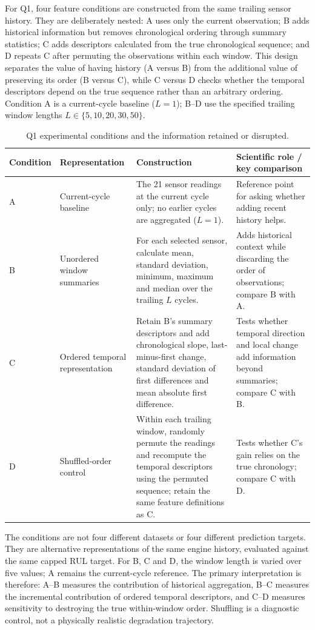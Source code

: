 \documentclass[10pt,a4paper]{article}
\begin{document}
For Q1, four feature conditions are constructed from the same trailing sensor history. They are deliberately nested: A uses only the current observation; B adds historical information but removes chronological ordering through summary statistics; C adds descriptors calculated from the true chronological sequence; and D repeats C after permuting the observations within each window. This design separates the value of having history (A versus B) from the additional value of preserving its order (B versus C), while C versus D checks whether the temporal descriptors depend on the true sequence rather than an arbitrary ordering. Condition A is a current-cycle baseline ($L=1$); B--D use the specified trailing window lengths $L\in\{5,10,20,30,50\}$.

\begin{table}[H]\centering\small
\caption{Q1 experimental conditions and the information retained or disrupted.}
\begin{tabularx}{\linewidth}{@{}l l Y Y@{}}\toprule
Condition & Representation & Construction & Scientific role / key comparison\\\midrule
A & Current-cycle baseline & The 21 sensor readings at the current cycle only; no earlier cycles are aggregated ($L=1$). & Reference point for asking whether adding recent history helps.\\
B & Unordered window summaries & For each selected sensor, calculate mean, standard deviation, minimum, maximum and median over the trailing $L$ cycles. & Adds historical context while discarding the order of observations; compare B with A.\\
C & Ordered temporal representation & Retain B's summary descriptors and add chronological slope, last-minus-first change, standard deviation of first differences and mean absolute first difference. & Tests whether temporal direction and local change add information beyond summaries; compare C with B.\\
D & Shuffled-order control & Within each trailing window, randomly permute the readings and recompute the temporal descriptors using the permuted sequence; retain the same feature definitions as C. & Tests whether C's gain relies on the true chronology; compare C with D.\\\bottomrule
\end{tabularx}
\end{table}

The conditions are not four different datasets or four different prediction targets. They are alternative representations of the same engine history, evaluated against the same capped RUL target. For B, C and D, the window length is varied over five values; A remains the current-cycle reference. The primary interpretation is therefore: A--B measures the contribution of historical aggregation, B--C measures the incremental contribution of ordered temporal descriptors, and C--D measures sensitivity to destroying the true within-window order. Shuffling is a diagnostic control, not a physically realistic degradation trajectory.
\end{document}

